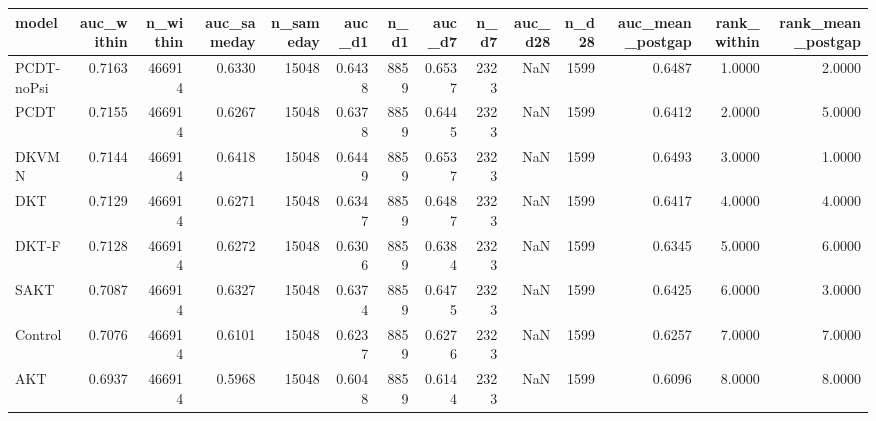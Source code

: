 \begin{tabular}{lrrrrrrrrrrrrr}
\toprule
model & auc\_within & n\_within & auc\_sameday & n\_sameday & auc\_d1 & n\_d1 & auc\_d7 & n\_d7 & auc\_d28 & n\_d28 & auc\_mean\_postgap & rank\_within & rank\_mean\_postgap \\
\midrule
PCDT-noPsi & 0.7163 & 466914 & 0.6330 & 15048 & 0.6438 & 8859 & 0.6537 & 2323 & NaN & 1599 & 0.6487 & 1.0000 & 2.0000 \\
PCDT & 0.7155 & 466914 & 0.6267 & 15048 & 0.6378 & 8859 & 0.6445 & 2323 & NaN & 1599 & 0.6412 & 2.0000 & 5.0000 \\
DKVMN & 0.7144 & 466914 & 0.6418 & 15048 & 0.6449 & 8859 & 0.6537 & 2323 & NaN & 1599 & 0.6493 & 3.0000 & 1.0000 \\
DKT & 0.7129 & 466914 & 0.6271 & 15048 & 0.6347 & 8859 & 0.6487 & 2323 & NaN & 1599 & 0.6417 & 4.0000 & 4.0000 \\
DKT-F & 0.7128 & 466914 & 0.6272 & 15048 & 0.6306 & 8859 & 0.6384 & 2323 & NaN & 1599 & 0.6345 & 5.0000 & 6.0000 \\
SAKT & 0.7087 & 466914 & 0.6327 & 15048 & 0.6374 & 8859 & 0.6475 & 2323 & NaN & 1599 & 0.6425 & 6.0000 & 3.0000 \\
Control & 0.7076 & 466914 & 0.6101 & 15048 & 0.6237 & 8859 & 0.6276 & 2323 & NaN & 1599 & 0.6257 & 7.0000 & 7.0000 \\
AKT & 0.6937 & 466914 & 0.5968 & 15048 & 0.6048 & 8859 & 0.6144 & 2323 & NaN & 1599 & 0.6096 & 8.0000 & 8.0000 \\
\bottomrule
\end{tabular}
